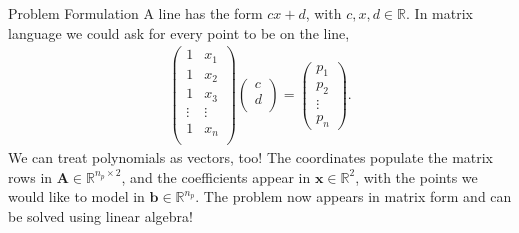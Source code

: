 \documentclass[notes]{beamer}
\begin{document}
    \begin{frame}{Problem Formulation}
      A line has the form $cx + d$, with $c,x,d \in \mathbb{R}$. In matrix language we could ask for every point to be on the line,
      \begin{align}
        \begin{pmatrix}
          1 & x_1 \\ 
          1 & x_2 \\
          1 & x_3 \\
          \vdots  & \vdots \\ 
          1 & x_n \\
        \end{pmatrix}
        \begin{pmatrix}
          c \\ d \\
        \end{pmatrix}
        = 
        \begin{pmatrix}
          p_1 \\
          p_2 \\
          \vdots \\ 
          p_n  
        \end{pmatrix}.
      \end{align}
      We can treat polynomials as vectors, too! The coordinates populate the matrix rows in $\mathbf{A} \in \mathbb{R}^{n_p \times 2}$, and the coefficients
      appear in $\mathbf{x} \in \mathbb{R}^{2}$, with the points we would like to model in $\mathbf{b} \in \mathbb{R}^{n_p}$.
      The problem now appears in matrix form and can be solved using linear algebra!
    \end{frame}
\end{document}
